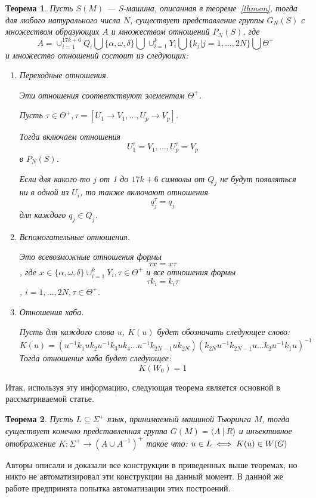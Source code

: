 \documentclass[14pt]{matmex-diploma-custom}
\newtheorem{thm}{Теорема}[subsection]
\begin{document}
\begin{thm} \label{sm2gr}
Пусть $ S (M) $ --- S-машина, описанная в теореме~\ref{thmsm},
тогда для любого натурального числа $ N $,
существует представление группы $ G_N (S) $
с множеством образующих $ A $ и множеством отношений $ P_N (S) $,
где
$$A = \cup^{17k+6}_{i=1} Q_i \bigcup \{\alpha, \omega, \delta\}
\bigcup \cup^k_{i=1}Y_i \bigcup \{k_j | j = 1, \dots, 2N\} \bigcup \Theta^+$$
и множество отношений состоит из следующих:
\begin{enumerate}
    \item Переходные отношения. 
    
    Эти отношения соответствуют элементам $\Theta^+$.
    
Пусть $\tau \in \Theta^+, \tau = [U_1 \to V_1, ..., U_p → V_p]$. 

Тогда включаем отношения 
$$U^{\tau}_1 = V_1, ..., U^{\tau}_p = V_p$$
в $P_N(S)$. 

Если для какого-то $j$ от 1 до $17k + 6$ символы от $Q_j$ не будут появляться ни в одной из $U_i$, 
то также включают отношения 
$$q^{\tau}_j = q_j$$
для каждого $q_j \in Q_j$.
    \item Вспомогательные отношения.

Это всевозможные отношения формы 
$$\tau x = x \tau$$
, где 
$x \in \{\alpha, \omega, \delta\} \cup^k_{i=1} Y_i, \tau \in \Theta^+$ и все отношения формы 
$$\tau k_i = k_i\tau$$ 
, $i = 1, ..., 2N, \tau \in \Theta^+$.
    \item Отношения хаба.

Пусть для каждого слова $u$, $K(u)$ будет обозначать следующее слово:
$$K(u) = (u^{−1}k_1uk_2u^{−1}k_3uk_4 . . . u^{−1}k_{2N−1}uk_{2N})(k_{2N}u^{−1}k_{2N−1}u . . . k_2u^{−1}k_1u)^{−1}$$
Тогда отношение хаба будет следующее:
$$K(W_0) = 1$$
\end{enumerate}
\end{thm}

Итак, используя эту информацию, следующая теорема является основной в рассматриваемой статье.

\begin{thm} \label{basethm}
Пусть $L \subseteq \Sigma^+$ язык, принимаемый машиной Тьюринга $M$,
    тогда существует конечно представленная группа $G(M)=\langle A~|~R \rangle$
    и инъективное отображение $K: \Sigma^+ \to (A \cup A^{-1})^+$ такое что:
    $\\u \in L \iff K(u)\in W(G)$
\end{thm}

Авторы описали и доказали все конструкции в приведенных выше теоремах,
но никто не автоматизировал эти конструкции на данный момент. В данной же работе предпринята попытка автоматизации этих построений. 
\end{document}
